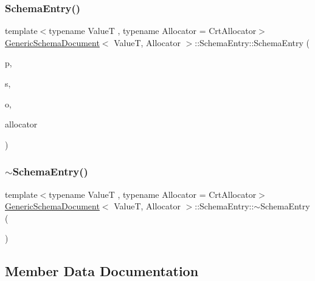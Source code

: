 \subsubsection{\texorpdfstring{Schema\+Entry()}{SchemaEntry()}}
{\footnotesize\ttfamily template$<$typename ValueT , typename Allocator  = Crt\+Allocator$>$ \\
\hyperlink{classGenericSchemaDocument}{Generic\+Schema\+Document}$<$ ValueT, Allocator $>$\+::Schema\+Entry\+::\+Schema\+Entry (\begin{DoxyParamCaption}\item[{const \hyperlink{classGenericSchemaDocument_aeb62f562d4dc024402b00f97cbcef747}{Pointer\+Type} \&}]{p,  }\item[{\hyperlink{classGenericSchemaDocument_acaf115202b159a2eb72c97c3dc6c3895}{Schema\+Type} $\ast$}]{s,  }\item[{bool}]{o,  }\item[{Allocator $\ast$}]{allocator }\end{DoxyParamCaption})\hspace{0.3cm}{\ttfamily [inline]}}

\mbox{\label{structGenericSchemaDocument_1_1SchemaEntry_a4c18d6d563b90be5cb16e66173bb0107}} 
\subsubsection{\texorpdfstring{$\sim$\+Schema\+Entry()}{~SchemaEntry()}}
{\footnotesize\ttfamily template$<$typename ValueT , typename Allocator  = Crt\+Allocator$>$ \\
\hyperlink{classGenericSchemaDocument}{Generic\+Schema\+Document}$<$ ValueT, Allocator $>$\+::Schema\+Entry\+::$\sim$\+Schema\+Entry (\begin{DoxyParamCaption}{ }\end{DoxyParamCaption})\hspace{0.3cm}{\ttfamily [inline]}}



\subsection{Member Data Documentation}
\mbox{\label{structGenericSchemaDocument_1_1SchemaEntry_a271f46ff3e4978d13b46739d107637ec}} 
